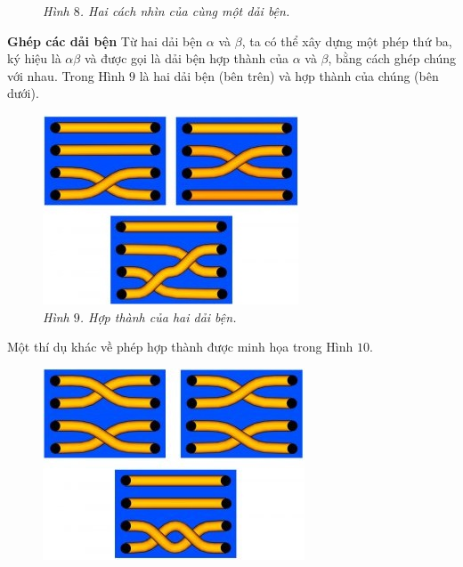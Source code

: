 \begin{multicols}{2}
\begin{figure}[H]
		\caption{\small\textit{\color{duongvaotoanhoc}Hình $8$. Hai cách nhìn của cùng một dải bện.}}
		\vspace*{-10pt}
	\end{figure}
	\textbf{\color{duongvaotoanhoc}Ghép các dải bện}
	\vskip 0.05cm
	Từ hai dải bện $\alpha$ và $\beta$, ta có thể xây dựng một phép thứ ba, ký hiệu là $\alpha \beta$ và được gọi là dải bện hợp thành của $\alpha$ và $\beta$, bằng cách ghép chúng với nhau. Trong Hình $9$ là hai dải bện (bên trên) và hợp thành của chúng (bên dưới).
	\begin{figure}[H]
		\vspace*{-5pt}
		\centering
		\captionsetup{labelformat= empty, justification=centering}
		\includegraphics[width= 0.97\linewidth]{fig_09}
		\caption{\small\textit{\color{duongvaotoanhoc}Hình $9$. Hợp thành của hai dải bện.}}
		\vspace*{-5pt}
	\end{figure}
	Một thí dụ khác về phép hợp thành được minh họa trong Hình $10$.
	\begin{figure}[H]
		\vspace*{-5pt}
		\centering
		\captionsetup{labelformat= empty, justification=centering}
		\includegraphics[width= 0.97\linewidth]{fig_10}

\end{figure}
\end{multicols}
